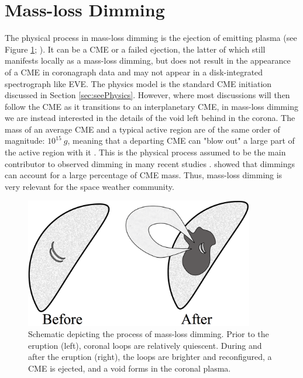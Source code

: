 \section{Mass-loss Dimming}
The physical process in mass-loss dimming is the ejection of emitting plasma (see Figure \ref{massLossDimming}; \citealt{Harrison2000, Harra2001}). It can be a CME or a failed ejection, the latter of which still manifests locally as a mass-loss dimming, but does not result in the appearance of a CME in coronagraph data and may not appear in a disk-integrated spectrograph like EVE. The physics model is the standard CME initiation discussed in Section \ref{sec:seePhysics}. However, where most discussions will then follow the CME as it transitions to an interplanetary CME, in mass-loss dimming we are instead interested in the details of the void left behind in the corona. The mass of an average CME and a typical active region are of the same order of magnitude: $10^{15}\ g$, meaning that a departing CME can "blow out" a large part of the active region with it \citep{Aschwanden2009}. This is the physical process assumed to be the main contributor to observed dimming in many recent studies \citep{Sterling1997, Reinard2008, Reinard2009, Aschwanden2009}. \citet{Harrison2003} showed that dimmings can account for a large percentage of CME mass. Thus, mass-loss dimming is very relevant for the space weather community.

\begin{figure}[!b]
	\caption[Schematic of mass-loss dimming]{
	    Schematic depicting the process of mass-loss dimming. Prior to the eruption (left), coronal loops are relatively 
	    quiescent. During and after the eruption (right), the loops are brighter and reconfigured, a CME is ejected, and a 
	    void forms in the coronal plasma.
	}
    \begin{center}
	    \includegraphics[width=100mm]{Images/MassLossDimming.png}
    \end{center}
    \label{massLossDimming}
\end{figure}

